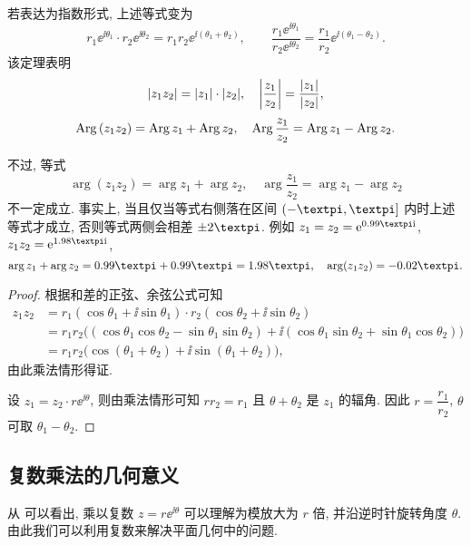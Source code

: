 若表达为指数形式, 上述等式变为
  \[
    r_1\ee^{\ii\theta_1}\cdot r_2\ee^{\ii\theta_2}=r_1r_2\ee^{\ii(\theta_1+\theta_2)},\qquad
    \frac{r_1\ee^{\ii\theta_1}}{r_2\ee^{\ii\theta_2}}=\frac{r_1}{r_2}\ee^{\ii(\theta_1-\theta_2)}.
  \]
该定理表明
\[
  \lvert z_1z_2\rvert=\lvert z_1\rvert\cdot\lvert z_2\rvert,\quad
  \biggl\vert\frac{z_1}{z_2}\biggr\vert=\frac{\lvert z_1\rvert}{\lvert z_2\rvert},
\]
\begin{equation}
  \label{eq:Arg-multiply-divide-equality}
  \operatorname{Arg}{(z_1z_2)}=\operatorname{Arg} z_1+\operatorname{Arg} z_2,\quad
  \operatorname{Arg}{\frac{z_1}{z_2}}=\operatorname{Arg} z_1-\operatorname{Arg} z_2.
\end{equation}

不过, 等式
\[
  \arg{(z_1z_2)}=\arg z_1+\arg z_2,\quad
  \arg{\dfrac{z_1}{z_2}}=\arg z_1-\arg z_2
\]
\alert{不一定成立}.
事实上, 当且仅当等式右侧落在区间 $(-\cpi,\cpi]$ 内时上述等式才成立, 否则等式两侧会相差 $\pm2\cpi$.
例如 $z_1=z_2=\ee^{0.99\cpi \ii}$, $z_1z_2=\ee^{1.98\cpi \ii}$,
\[
  \arg z_1+\arg z_2=0.99\cpi+0.99\cpi=1.98\cpi,\quad
  \arg(z_1z_2)=-0.02\cpi.
\]

\begin{proof}
  根据和差的正弦、余弦公式可知
  \begin{align*}
     z_1z_2&
    =r_1(\cos\theta_1+\ii\sin\theta_1)\cdot
     r_2(\cos\theta_2+\ii\sin\theta_2)\\&
    =r_1r_2\bigl(
       (\cos\theta_1\cos\theta_2-\sin\theta_1\sin\theta_2)
    +\ii(\cos\theta_1\sin\theta_2+\sin\theta_1\cos\theta_2)
     \bigr)\\&
    =r_1r_2\bigl(
      \cos(\theta_1+\theta_2)+\ii\sin(\theta_1+\theta_2)
     \bigr),
  \end{align*}
  由此乘法情形得证.

  设 $z_1=z_2\cdot r\ee^{\ii\theta}$, 则由乘法情形可知 $rr_2=r_1$ 且 $\theta+\theta_2$ 是 $z_1$ 的辐角.
  因此 $r=\dfrac{r_1}{r_2}$, $\theta$ 可取 $\theta_1-\theta_2$.
\end{proof}


\subsection{复数乘法的几何意义}

从 可以看出, 乘以复数 $z=r\ee^{\ii\theta}$ 可以理解为\alert{模放大为 $r$ 倍, 并沿逆时针旋转角度 $\theta$}.
由此我们可以利用复数来解决平面几何中的问题.

